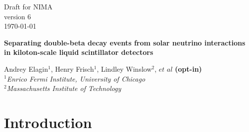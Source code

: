 \documentclass[12pt,twoside,letterpaper]{article}
\newcommand{\vbb}{0\nu\beta\beta}
\newcommand{\B}{^{8}B}
\begin{document}
\vspace*{-3.5cm}
\begin{flushright}
Draft for NIMA\\
version 6\\
\today
\end{flushright}



\begin{center}
  \begin{Large}
  {\bf Separating double-beta decay events from solar neutrino interactions in kiloton-scale liquid scintillator detectors}
  \end{Large}
\end{center}


\begin{center}
Andrey Elagin$^1$, Henry Frisch$^1$, Lindley Winslow$^2$, $et$ $al$ {\bf (opt-in)}\\
\emph{$^1$Enrico Fermi Institute, University of Chicago\\ 
$^2$Massachusetts Institute of Technology}
\end{center}



\begin{abstract}
We propose a technique for separating $\vbb$-decay events from background due to $\B$ solar neutrino interactions in a liquid scintillator detector. The technique compares event topology of the signal and background events using spherical harmonics analysis of the early light emitted in $\vbb$-decay and $\B$ events. Selection of early photons using fast photo-detectors allows for separation of directional Cherenkov from isotropic scintillation light and identification of two event topologies based on the spatial distribution of the early photons in the detector.
\end{abstract}

\newpage
\tableofcontents
\newpage





\section{Introduction}
\end{document}
